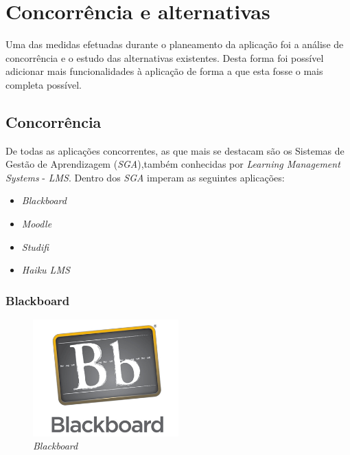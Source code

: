 \section{Concorrência e alternativas}

Uma das medidas efetuadas durante o planeamento da aplicação foi a análise de concorrência e o estudo das alternativas existentes. Desta forma foi possível adicionar mais funcionalidades à aplicação de forma a que esta fosse o mais completa possível.

\subsection{Concorrência}
\label{sub:concorrencia}

De todas as aplicações concorrentes, as que mais se destacam são os Sistemas de Gestão de Aprendizagem (\emph{SGA}),também conhecidas por \emph{Learning Management Systems} - \emph{LMS}. Dentro dos \emph{SGA} imperam as seguintes aplicações:
\begin{itemize}
	\item \emph{Blackboard}
	\item \emph{Moodle}
	\item \emph{Studifi}
	\item \emph{Haiku LMS}
\end{itemize}

\subsubsection{Blackboard}
\label{ssub:blackboard}

\begin{figure}[H]
        \centering
        \includegraphics[width=0.5\textwidth]{images/concorrencia/blackboard.jpg}
         \caption{\emph{Blackboard}}
         \label{fig: blackboard}
\end{figure}


